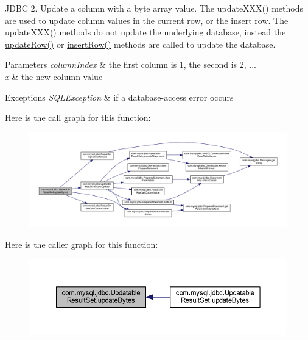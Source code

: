J\+D\+BC 2. Update a column with a byte array value. The update\+X\+X\+X() methods are used to update column values in the current row, or the insert row. The update\+X\+X\+X() methods do not update the underlying database, instead the \mbox{\hyperlink{classcom_1_1mysql_1_1jdbc_1_1_updatable_result_set_a919969ba4b3c7cbc7b18605e9f31a746}{update\+Row()}} or \mbox{\hyperlink{classcom_1_1mysql_1_1jdbc_1_1_updatable_result_set_aef041f8d9d0778083716fc26652648fa}{insert\+Row()}} methods are called to update the database.


\begin{DoxyParams}{Parameters}
{\em column\+Index} & the first column is 1, the second is 2, ... \\
\hline
{\em x} & the new column value\\
\hline
\end{DoxyParams}

\begin{DoxyExceptions}{Exceptions}
{\em S\+Q\+L\+Exception} & if a database-\/access error occurs \\
\hline
\end{DoxyExceptions}
Here is the call graph for this function\+:
\nopagebreak
\begin{figure}[H]
\begin{center}
\leavevmode
\includegraphics[width=350pt]{classcom_1_1mysql_1_1jdbc_1_1_updatable_result_set_a08a332f7047e0f8cec9b2b0197b38fbf_cgraph}
\end{center}
\end{figure}
Here is the caller graph for this function\+:
\nopagebreak
\begin{figure}[H]
\begin{center}
\leavevmode
\includegraphics[width=350pt]{classcom_1_1mysql_1_1jdbc_1_1_updatable_result_set_a08a332f7047e0f8cec9b2b0197b38fbf_icgraph}
\end{center}
\end{figure}
\mbox{\label{classcom_1_1mysql_1_1jdbc_1_1_updatable_result_set_aad66d9ed9b558743064d1723c3c2b273}} 
